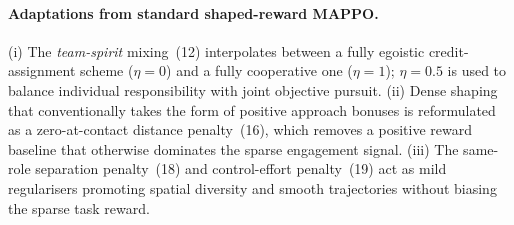 \documentclass[11pt,a4paper]{article}
\begin{document}
\paragraph{Adaptations from standard shaped-reward MAPPO.}
(i) The \emph{team-spirit} mixing~(12) interpolates between a fully
egoistic credit-assignment scheme ($\eta=0$) and a fully cooperative one
($\eta=1$); $\eta=0.5$ is used to balance individual responsibility with
joint objective pursuit. (ii) Dense shaping that conventionally takes the
form of positive approach bonuses is reformulated as a zero-at-contact
distance penalty~(16), which removes a positive reward baseline that
otherwise dominates the sparse engagement signal. (iii) The
same-role separation penalty~(18) and control-effort penalty~(19) act as
mild regularisers promoting spatial diversity and smooth trajectories
without biasing the sparse task reward.
\end{document}
